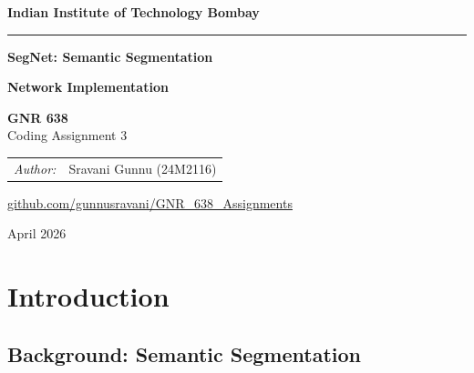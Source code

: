 \documentclass[11pt,a4paper]{report}
\author{}
\date{}
\begin{document}
\begin{titlepage}
\centering
\vspace*{1.2cm}

{\Large \textbf{Indian Institute of Technology Bombay} \par}

\vspace{0.4cm}
{\color{titleaccent}\rule{0.5\textwidth}{1.2pt}}
\vspace{1.2cm}

{\Huge \textbf{\color{sectionblue} SegNet: Semantic Segmentation} \par}
\vspace{0.4em}
{\Huge \textbf{\color{sectionblue} Network Implementation} \par}

\vspace{1cm}

{\large \textbf{\color{subsectionblue} GNR 638} \\ Coding Assignment 3 \par}

\vspace{1.8cm}

{\large
\begin{tabular}{ll}
\textit{Author:} & Sravani Gunnu (24M2116) \\
\end{tabular}
}

\vspace{0.8em}
{\normalsize \href{https://github.com/gunnusravani/GNR_638_Assignments}{github.com/gunnusravani/GNR\_638\_Assignments}}

\vfill

{\normalsize \color{subsectionblue} April 2026}

\end{titlepage}

\tableofcontents
\clearpage

\chapter{Introduction}

\section*{Background: Semantic Segmentation}
\end{document}
